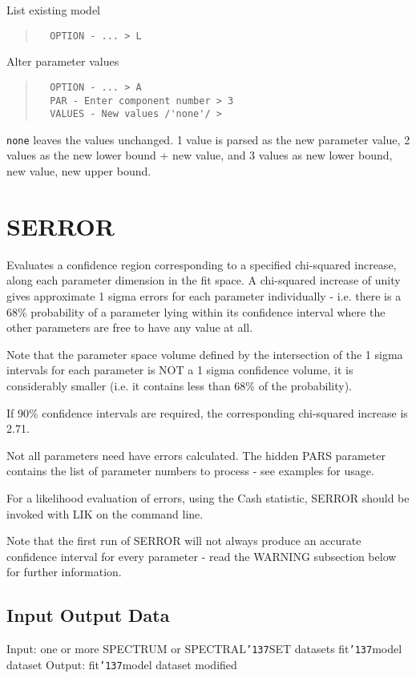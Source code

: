 \documentclass{book}
\renewcommand{\_}{{\tt\char'137}}     %
\begin{document}
List existing model
\begin{quote}\begin{verbatim}
  OPTION - ... > L
\end{verbatim}\end{quote}
Alter parameter values
\begin{quote}\begin{verbatim}
  OPTION - ... > A
  PAR - Enter component number > 3
  VALUES - New values /'none'/ >
\end{verbatim}\end{quote}
{\tt none} leaves the values unchanged. 1 value is parsed as the new
parameter value, 2 values as the new lower bound + new value, and
3 values as new lower bound, new value, new upper bound.
 
\section{SERROR}
Evaluates a confidence region corresponding to a specified
chi-squared increase, along each parameter dimension in the fit
space. A chi-squared increase of unity gives approximate 1 sigma
errors for each parameter individually - i.e. there is a 68\%
probability of a parameter lying within its confidence interval
where the other parameters are free to have any value at all.
 
Note that the parameter space volume defined by the intersection
of the 1 sigma intervals for each parameter is NOT a 1 sigma
confidence volume, it is considerably smaller (i.e. it contains
less than 68\% of the probability).
 
If 90\% confidence intervals are required, the corresponding
chi-squared increase is 2.71.
 
Not all parameters need have errors calculated. The hidden PARS
parameter contains the list of parameter numbers to process - see
examples for usage.
 
For a likelihood evaluation of errors, using the Cash statistic,
SERROR should be invoked with LIK on the command line.
 
Note that the first run of SERROR will not always produce an
accurate confidence interval for every parameter - read the
WARNING subsection below for further information.
 
\subsection{Input Output Data}
Input: one or more SPECTRUM or SPECTRAL\_SET datasets
fit\_model dataset
Output: fit\_model dataset modified
\end{document}
